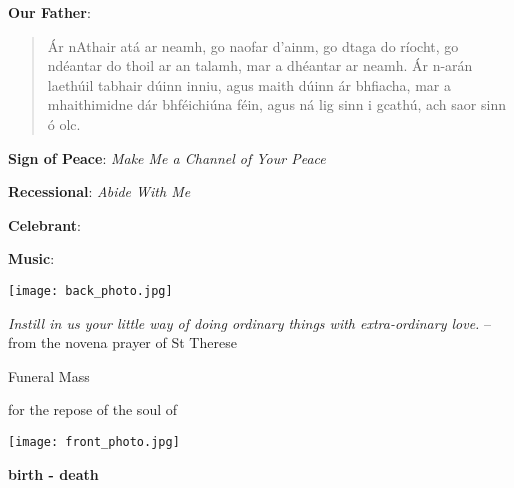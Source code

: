 \documentclass[14pt,landscape]{extarticle}
\begin{document}
\begin{multicols}{2}
{\bf Our Father}:

\begin {quote}
\'Ar nAthair at\'a ar neamh, go naofar d'ainm, go dtaga do r\'iocht, 
go nd\'eantar do thoil ar an talamh, mar a dh\'eantar ar neamh.
\'Ar n-ar\'an laeth\'uil tabhair d\'uinn inniu, 
agus maith d\'uinn \'ar bhfiacha, mar a mhaithimidne d\'ar bhf\'eichi\'una f\'ein,
agus n\'a lig sinn i gcath\'u, ach saor sinn \'o olc.

\end{quote}

\vspace{1em}

{\bf Sign of Peace}: {\em Make Me a Channel of Your Peace}

\vspace{1em}

{\bf Recessional}: {\em Abide With Me}

\newpage


{\bf Celebrant}: 

{\bf Music}: 

\vspace{5em}

\begin{center}
\texttt{[image: back\_photo.jpg]}
\end{center}

\vspace{5em}

{\em Instill in us your little way of doing
ordinary things with extra-ordinary love.} -- from the novena prayer of St
Therese

\columnbreak


\begin{center}

\vspace{5em}

{\large
Funeral Mass 

for the repose of the soul of 

\vspace{1em}

{\bf }}

\vspace{5em}

\texttt{[image: front\_photo.jpg]}

\vspace{5em}

{\bf birth - death}

\vspace{5em}


\end{center}


\end{multicols}
\end{document}
